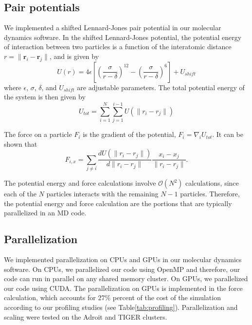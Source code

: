 \documentclass[12pt]{article}
\begin{document}
\subsection{Pair potentials} \label{subsec:potential}

We implemented a shifted Lennard-Jones pair potential in our molecular dynamics software.
%
In the shifted Lennard-Jones potential, the potential energy of interaction between two particles is a function of the interatomic distance $r = \|\mathbf{r}_i - \mathbf{r}_j \|$, and is given by
\begin{equation}
U(r) = 4 \epsilon\left[ \left( \frac{\sigma}{r-\delta} \right)^{12} - \left( \frac{\sigma}{r-\delta} \right)^6 \right] + U_{shift}
\end{equation}
where $\epsilon$, $\sigma$, $\delta$, and $U_{shift}$ are adjustable parameters.
%
The total potential energy of the system is then given by
\begin{equation}
U_{tot} = \sum_{i=1}^{N} \sum_{j=1}^{i-1} U\left( \| r_i - r_j \| \right)
\end{equation}

The force on a particle $F_i$ is the gradient of the potential, $F_i = \nabla_i U_{tot}$.
%
It can be shown that
\begin{equation}
F_{i, x} = \sum_{j \ne i} \frac{d U\left( \| r_i - r_j \| \right)}{d \| r_i - r_j \| } \frac{x_i - x_j}{\|r_i - r_j\|}.
\end{equation}

The potential energy and force calculations involve $\mathcal{O}(N^2)$ calculations, since each of the $N$ particles interacts with the remaining $N-1$ particles.
%
Therefore, the potential energy and force calculation are the portions that are typically parallelized in an MD code.

\subsection{Parallelization}

We implemented parallelization on CPUs and GPUs in our molecular dynamics software.
%
On CPUs, we parallelized our code using OpenMP and therefore, our code can run in parallel on any shared memory cluster.
%
On GPUs, we parallelized our code using CUDA.
The parallelization on GPUs is implemented in the force calculation, which accounts for 27\% percent of the cost of the simulation according to our profiling studies (see Table\ref{tab:profiling}).
%
Parallelization and scaling were tested on the Adroit and TIGER clusters.
\end{document}
